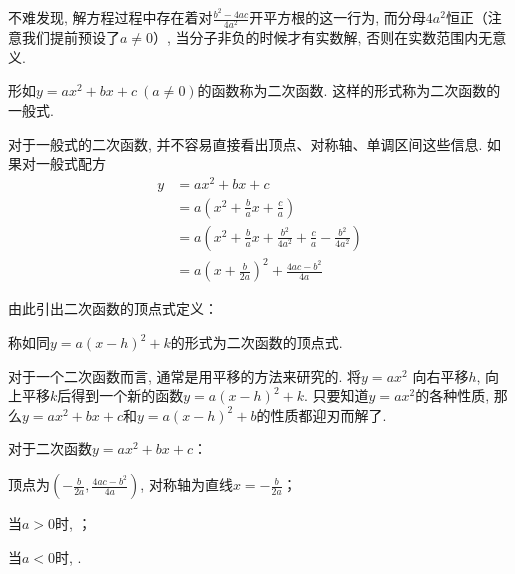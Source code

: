 不难发现, 解方程过程中存在着对\(\frac{b^2-4ac}{4a^2}\)开平方根的这一行为, 而分母\(4a^2\)恒正（注意我们提前预设了\(a\neq0\)）, 
当分子非负的时候才有实数解, 否则在实数范围内无意义. 

\begin{definition}[二次函数]
    形如\(y=ax^2+bx+c\ (a\neq0)\)的函数称为二次函数. 这样的形式称为二次函数的一般式. 
\end{definition}

对于一般式的二次函数, 并不容易直接看出顶点、对称轴、单调区间这些信息. 
如果对一般式配方
\begin{align*}
    y&=ax^2+bx+c\\
    &=a(x^2+\frac{b}{a}x+\frac{c}{a})\\
    &=a(x^2+\frac{b}{a}x+\frac{b^2}{4a^2}+\frac{c}{a}-\frac{b^2}{4a^2})\\
    &=a(x+\frac{b}{2a})^2+\frac{4ac-b^2}{4a}
\end{align*}

由此引出二次函数的顶点式定义：
\begin{definition}
    称如同\(y=a(x-h)^2+k\)的形式为二次函数的顶点式. 
\end{definition}
对于一个二次函数而言, 通常是用平移的方法来研究的. 将\(y=ax^2\)
向右平移\(h\), 向上平移\(k\)后得到一个新的函数\(y=a(x-h)^2+k\). 
只要知道\(y=ax^2\)的各种性质, 那么\(y=ax^2+bx+c\)和\(y=a(x-h)^2+b\)的性质都迎刃而解了. 

\begin{character}
    对于二次函数\(y=ax^2+bx+c\)：

    顶点为\((-\frac{b}{2a},\frac{4ac-b^2}{4a})\), 对称轴为直线\(x=-\frac{b}{2a}\)；

    当\(a>0\)时, ；

    当\(a<0\)时, . 
\end{character}

